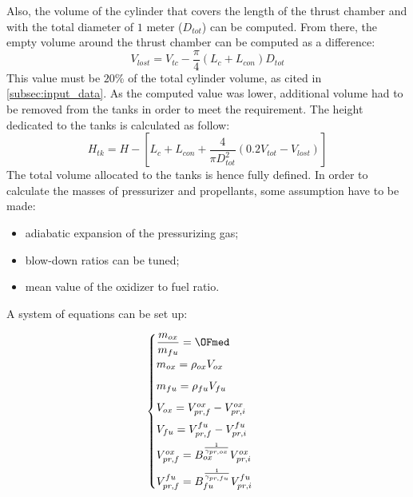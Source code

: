 Also, the volume of the cylinder that covers the length of the thrust chamber and with the total diameter of $1$ meter ($D_{tot}$) can be computed. From there, the empty volume around the thrust chamber can be computed as a difference:
\begin{equation}
    V_{lost} =  V_{tc} - \frac{\pi}{4} \left(L_{c} + L_{con}\right) D_{tot}
\end{equation}
This value must be $20$\% of the total cylinder volume, as cited in \autoref{subsec:input_data}. As the computed value was lower, additional volume had to be removed from the tanks in order to meet the requirement. The height dedicated to the tanks is calculated as follow:
\begin{equation}
    H_{tk} =  H - \left[L_{c} + L_{con} + \frac{4}{\pi D_{tot}^2}\left( 0.2 V_{tot} - V_{lost}\right) \right]
\end{equation}
The total volume allocated to the tanks is hence fully defined. 
In order to calculate the masses of pressurizer and propellants, some assumption have to be made:
\begin{itemize}
    \item adiabatic expansion of the pressurizing gas;
    \item blow-down ratios can be tuned;
    \item mean value of the oxidizer to fuel ratio.
\end{itemize}

A system of equations can be set up:

\begin{equation}
    \begin{cases}
    \dfrac{m_{ox}}{m_{fu}} = \OFmed
    \\[5pt]
    m_{ox} = \rho_{ox}V_{ox}
    \\[5pt]
    m_{fu} = \rho_{fu}V_{fu}
    \\[5pt]
    V_{ox} = V_{pr, f}^{ox} - V_{pr, i}^{ox}
    \\[5pt]
    V_{fu} = V_{pr, f}^{fu} - V_{pr, i}^{fu}
    \\[5pt]
    V_{pr,f}^{ox} = B_{ox}^{\frac{1}{\gamma_{pr,ox}}}V_{pr, i}^{ox}
    \\[5pt]
    V_{pr,f}^{fu} = B_{fu}^{\frac{1}{\gamma_{pr,fu}}}V_{pr, i}^{fu}
    \end{cases}\
    \label{eq:sistema_fata_turchina}
\end{equation}

\vspace{3mm}

